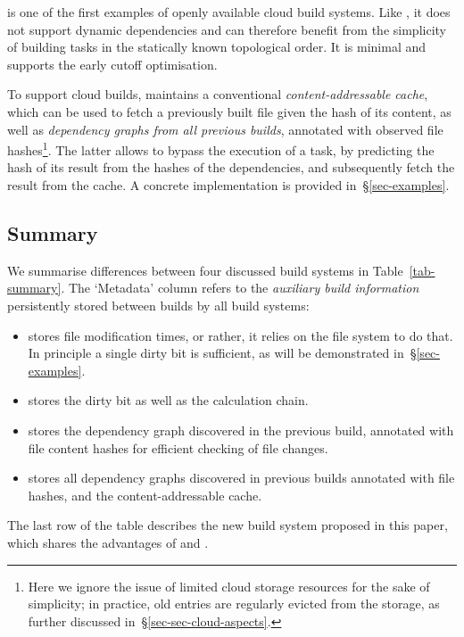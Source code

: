 \Bazel is one of the first examples of openly available cloud build systems.
Like \Make, it does not support dynamic dependencies and can therefore benefit
from the simplicity of building tasks in the statically known topological order.
It is minimal and supports the early cutoff optimisation.

To support cloud builds, \Bazel maintains a conventional \emph{content-addressable
cache}, which can be used to fetch a previously built file given the hash of its
content, as well as \emph{dependency graphs from all previous builds}, annotated
with observed file hashes\footnote{Here we ignore the issue of limited cloud
storage resources for the sake of simplicity; in practice, old entries are
regularly evicted from the storage, as further discussed
in~\S\ref{sec-sec-cloud-aspects}.}. The latter allows to bypass the execution of
a task, by predicting the hash of its result from the hashes of the dependencies,
and subsequently fetch the result from the cache. A concrete implementation is
provided in~\S\ref{sec-examples}.

\subsection{Summary}
\label{sec-background-summary}

We summarise differences between four discussed build systems in
Table~\ref{tab-summary}. The `Metadata' column refers to the \emph{auxiliary
build information} persistently stored between builds by all build systems:
\begin{itemize}
    \item \Make stores file modification times, or rather, it relies on the file
    system to do that. In principle a single dirty bit is sufficient, as will be
    demonstrated in~\S\ref{sec-examples}.
    \item \Excel stores the dirty bit as well as the calculation chain.
    \item \Shake stores the dependency graph discovered in the previous build,
    annotated with file content hashes for efficient checking of file changes.
    \item \Bazel stores all dependency graphs discovered in previous builds
    annotated with file hashes, and the content-addressable cache.
\end{itemize}

The last row of the table describes the new build system proposed in this paper,
which shares the advantages of \Shake and \Bazel.

